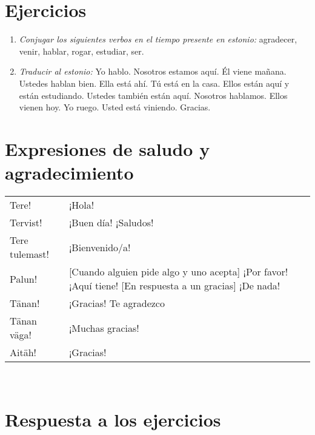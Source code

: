 \section*{\Large{Ejercicios}}

\begin{enumerate}
	\item \emph{Conjugar los siguientes verbos en el tiempo presente en estonio:} agradecer, venir, hablar, rogar, estudiar, ser.
	\item \emph{Traducir al estonio:} Yo hablo. Nosotros estamos aquí. Él viene mañana. Ustedes hablan bien. Ella está ahí. Tú está en la casa. Ellos están aquí y están estudiando. Ustedes también están aquí. Nosotros hablamos. Ellos vienen hoy. Yo ruego. Usted está viniendo. Gracias.
\end{enumerate}

\section*{\Large{Expresiones de saludo y agradecimiento}}

\begin{tabular}{ l p{8cm} }
	Tere!					& ¡Hola! \\
	Tervist!				& ¡Buen día! ¡Saludos! \\
	Tere tulemast! 			& ¡Bienvenido/a! \\
	Palun!					& \small{[Cuando alguien pide algo y uno acepta]} ¡Por favor! ¡Aquí tiene! \small{[En respuesta a un gracias]} ¡De nada! \\
	Tänan!					& ¡Gracias! Te agradezco \\
	Tänan väga! 			& ¡Muchas gracias! \\
	Aitäh!					& ¡Gracias!
\end{tabular}\\ \bigskip

\section*{\Large{Respuesta a los ejercicios}}

